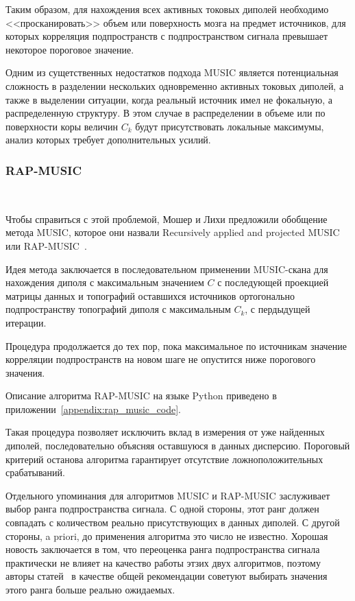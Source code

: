 Таким образом, для нахождения всех активных токовых диполей необходимо
<<просканировать>> объем или поверхность мозга на предмет источников, для которых
корреляция подпространств с подпространством сигнала превышает некоторое
пороговое значение. 

Одним из сущетственных недостатков подхода MUSIC является потенциальная
сложность в разделении нескольких одновременно активных токовых диполей, а также
в выделении ситуации, когда реальный источник имел не фокальную, а распределенную
структуру. В этом случае в распределении в объеме или по поверхности коры
величин $C_k$ будут присутствовать локальные максимумы, анализ которых требует дополнительных
усилий.


\subsubsection{RAP-MUSIC}~\label{subsection:rap_music}

Чтобы справиться с этой проблемой, Мошер и Лихи предложили обобщение метода MUSIC, которое
они назвали Recursively applied and projected MUSIC или RAP-MUSIC~\cite{Mosher1999}.

Идея метода заключается в последовательном применении MUSIC-скана для нахождения
диполя с максимальным значением $C$ с последующей проекцией матрицы данных и топографий оставшихся источников
ортогонально подпространству топографий диполя с максимальным $C_k$, с пердыдущей итерации.

Процедура продолжается до тех пор, пока максимальное по источникам значение корреляции подпространств
на новом шаге не опустится ниже порогового значения.

Описание алгоритма RAP-MUSIC на языке Python приведено в приложении~\ref{appendix:rap_music_code}.

Такая процедура позволяет исключить вклад в измерения от уже найденных
диполей, последовательно объясняя оставшуюся в данных дисперсию.
Пороговый критерий останова алгоритма гарантирует отсутствие ложноположительных
срабатываний.

Отдельного упоминания для алгоритмов MUSIC и RAP-MUSIC заслуживает выбор
ранга подпространства сигнала. С одной стороны, этот ранг должен совпадать
с количеством реально присутствующих в данных диполей. С другой стороны,
a priori, до применения алгоритма это число не известно. Хорошая новость заключается
в том, что переоценка ранга подпространства сигнала практически не влияет на
качество работы этзих двух алгоритмов,
поэтому авторы статей~\cite{Mosher1992, Mosher1999} в качестве общей рекомендации
советуют выбирать значения этого ранга больше реально ожидаемых.

